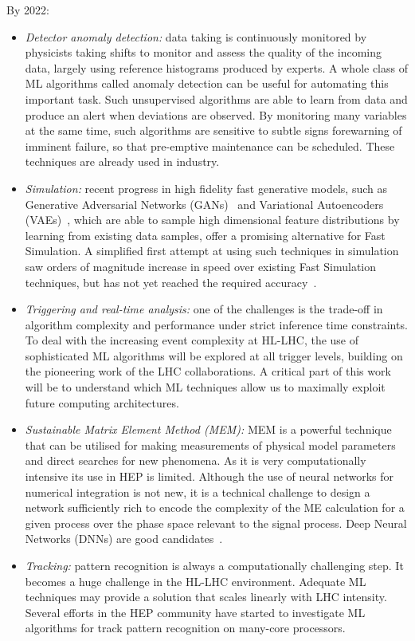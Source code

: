 By 2022:
\begin{itemize}
\item
  \emph{Detector anomaly detection:} data taking is
  continuously monitored by physicists taking shifts to monitor and
  assess the quality of the incoming data, largely using reference
  histograms produced by experts. A whole class of ML algorithms called anomaly detection
  can be useful for automating this important task. Such unsupervised algorithms are able
  to learn from data and produce an alert when deviations are observed.
  By monitoring many variables at the same time, such algorithms are
  sensitive to subtle signs forewarning of imminent failure, so that
  pre-emptive maintenance can be scheduled. These techniques are already
  used in industry.
\item
  \emph{Simulation:} recent progress in high fidelity fast generative models,
  such as Generative Adversarial Networks (GANs)~\cite{NIPS2014_5423} and Variational
  Autoencoders (VAEs)~\cite{2013arXiv1312.6114K}, 
  which are able to sample high dimensional feature
  distributions by learning from existing data samples, offer a
  promising alternative for Fast Simulation. A simplified first attempt at
  using such techniques in simulation saw orders of magnitude increase
  in speed over existing Fast Simulation techniques, but has not yet
  reached the required accuracy~\cite{CaloGAN}.
\item
  \emph{Triggering and real-time analysis:} one of the challenges is the
  trade-off in algorithm complexity and performance under strict
  inference time constraints. To deal with the increasing event
  complexity at HL-LHC, the use of sophisticated ML
  algorithms will be explored at all trigger levels, building on the pioneering work of
  the LHC collaborations. A critical part of this work will be to
  understand which ML techniques allow us to maximally exploit
  future computing architectures.
\item
  \emph{Sustainable Matrix Element Method (MEM):} MEM is a powerful
  technique that can be utilised for making measurements of physical model
  parameters and direct searches for new phenomena. As it is
  very computationally intensive its use in HEP is limited.
  Although the use of neural networks for numerical integration is not new, 
  it is a
  technical challenge to design a network sufficiently rich
  to encode the complexity of the ME calculation for a given process
  over the phase space relevant to the signal process. Deep Neural
  Networks (DNNs) are good candidates~\cite{Bendavid2017,BendavidIML2017}.
\item
  \emph{Tracking:} pattern recognition is always a computationally challenging
  step. It becomes a huge challenge in the HL-LHC environment.
  Adequate ML techniques may provide a solution that scales linearly
  with LHC intensity. Several efforts in the HEP community have started
  to investigate ML algorithms for track pattern recognition on
  many-core processors.
\end{itemize}

